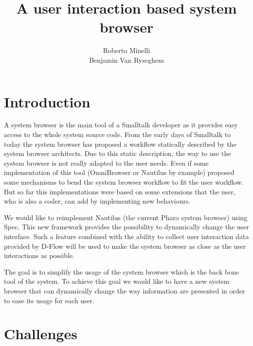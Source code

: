 \documentclass[12pt]{article}
\begin{document}
\title{A user interaction based system browser}
\author{Roberto Minelli\\Benjamin Van Ryseghem}
\maketitle

\section{Introduction}

A system browser is the main tool of a Smalltalk developer as it provides easy access to the whole system source code.
From the early days of Smalltalk to today the system browser has proposed a workflow statically described by the system browser architects.
Due to this static description, the way to use the system browser is not really adapted to the user needs. 
Even if some implementation of this tool (OmniBrowser or Nautilus by example) proposed some mechanisms to bend the system browser workflow to fit the user workflow.
But so far this implementations were based on some extensions that the user, who is also a coder, can add by implementing new behaviours.

We would like to reimplement Nautilus (the current Pharo system browser) using Spec.
This new framework provides the possibility to dynamically change the user interface.
Such a feature combined with the ability to collect user interaction data provided by D-Flow will be used to make the system browser 
as close as the user interactions as possible.

The goal is to simplify the usage of the system browser which is the back bone tool of the system. 
To achieve this goal we would like to have a new system browser that can dynamically change the way information are presented in order to ease its usage for each user.

\section{Challenges}
\end{document}
